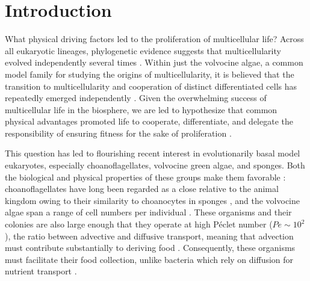
\chapter{Introduction} \label{ch:1} %

\ifpdf
    \graphicspath{{Chapter1/Figs/Raster/}{Chapter1/Figs/PDF/}{Chapter1/Figs/}}
\else
    \graphicspath{{Chapter1/Figs/Vector/}{Chapter1/Figs/}}
\fi

What physical driving factors led to the proliferation of multicellular life?
Across all eukaryotic lineages, phylogenetic evidence suggests that multicellularity evolved independently several times \citep{king2004}.
Within just the volvocine algae, a common model family for studying the origins of multicellularity, it is believed that the transition to multicellularity and cooperation of distinct differentiated cells has repeatedly emerged independently \citep{herron2008}.
Given the overwhelming success of multicellular life in the biosphere, we are led to hypothesize that common physical advantages promoted life to cooperate, differentiate, and delegate the responsibility of ensuring fitness for the sake of proliferation \citep{grosberg2007}.

This question has led to flourishing recent interest in evolutionarily basal model eukaryotes, especially choanoflagellates, volvocine green algae, and sponges.
Both the biological and physical properties of these groups make them favorable \citep{goldstein2015}: choanoflagellates have long been regarded as a close relative to the animal kingdom owing to their similarity to choanocytes in sponges \citep{james1871}, and the volvocine algae span a range of cell numbers per individual \citep{kirk2005}.
These organisms and their colonies are also large enough that they operate at high P\'eclet number ($Pe \sim 10^2$), the ratio between advective and diffusive transport, meaning that advection must contribute substantially to deriving food \citep{solari2006}. 
Consequently, these organisms must facilitate their food collection, unlike bacteria which rely on diffusion for nutrient transport \citep{berg1977}.

